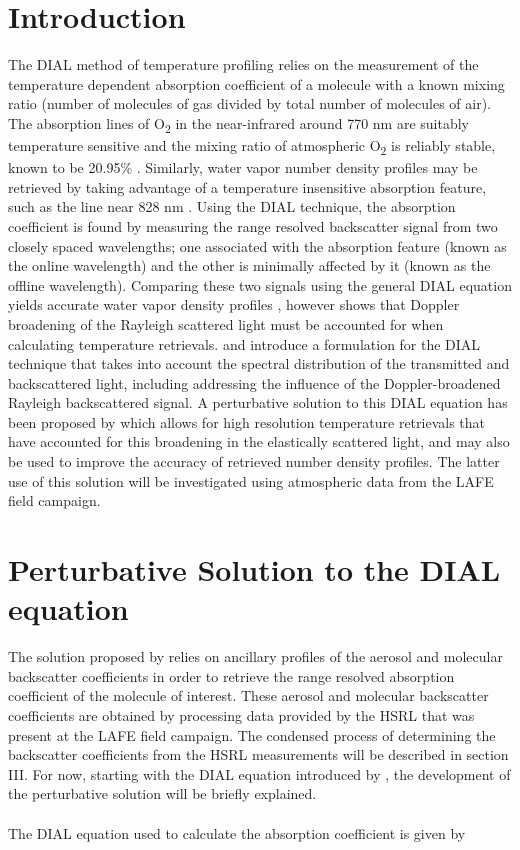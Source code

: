 \documentclass[twoside]{article}
\begin{document}
\section{Introduction}
The DIAL method of temperature profiling relies on the measurement of the temperature dependent absorption coefficient of a molecule with a known mixing ratio (number of molecules of gas divided by total number of molecules of air). 
The absorption lines of O\textsubscript{2} in the near-infrared around 770 nm are suitably temperature sensitive \cite{Bosenberg1998} and the mixing ratio of atmospheric O\textsubscript{2} is reliably stable, known to be 20.95\% \cite{Jacobson1999}.
Similarly, water vapor number density profiles may be retrieved by taking advantage of a temperature insensitive absorption feature, such as the line near 828 nm \cite{Nehrir2009}.
Using the DIAL technique, the absorption coefficient is found by measuring the range resolved backscatter signal from two closely spaced wavelengths; one associated with the absorption feature (known as the online wavelength) and the other is minimally affected by it (known as the offline wavelength).
Comparing these two signals using the general DIAL equation yields accurate water vapor density profiles \cite{Nehrir2009}, however \citet{Bosenberg1998} shows that Doppler broadening of the Rayleigh scattered light must be accounted for when calculating temperature retrievals.
\citet{Theopold1993} and \citet{Bosenberg1998} introduce a formulation for the DIAL technique that takes into account the spectral distribution of the transmitted and backscattered light, including addressing the influence of the Doppler-broadened Rayleigh backscattered signal. A perturbative solution to this DIAL equation has been proposed by \citet{Bunn2018} which allows for high resolution temperature retrievals that have accounted for this broadening in the elastically scattered light, and may also be used to improve the accuracy of retrieved number density profiles. The latter use of this solution will be investigated using atmospheric data from the LAFE field campaign.

\section{Perturbative Solution to the DIAL equation}

The solution proposed by \citet{Bunn2018} relies on ancillary profiles of the aerosol and molecular backscatter coefficients in order to retrieve the range resolved absorption coefficient of the molecule of interest. These aerosol and molecular backscatter coefficients are obtained by processing data provided by the HSRL \cite{Hayman2017} that was present at the LAFE field campaign. The condensed process of determining the backscatter coefficients from the HSRL measurements will be described in section III.  For now, starting with the DIAL equation introduced by \citet{Bosenberg1998}, the development of the perturbative solution will be briefly explained.\\
\\
The DIAL equation used to calculate the absorption coefficient is given by \cite{Bosenberg1998}
\end{document}
